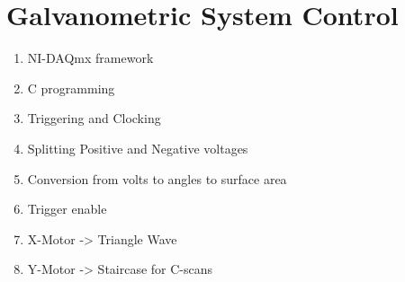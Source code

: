
\section{Galvanometric System Control}
	\begin{enumerate}
		\item NI-DAQmx framework
		\item C programming
		\item Triggering and Clocking
		\item Splitting Positive and Negative voltages
		\item Conversion from volts to angles to surface area
		\item Trigger enable
		\item X-Motor -> Triangle Wave
		\item Y-Motor -> Staircase for C-scans		
	\end{enumerate}





